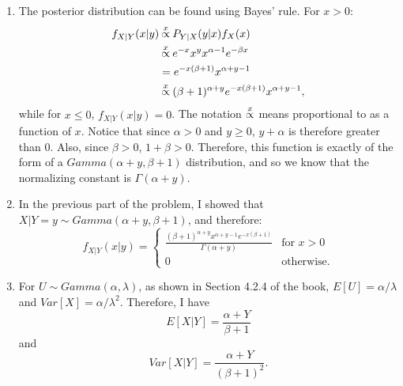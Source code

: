 \begin{problem}{17} $ $
\begin{enumerate}


\item The posterior distribution can be found using Bayes' rule.  For $x>0:$
\begin{align*}
f_{X|Y}(x|y) & \propof{x} P_{Y|X}(y|x)f_X(x) \\
& \propof{x} e^{-x}x^yx^{\alpha-1}e^{-\beta x} \\
& = e^{-x (\beta+1)} x^{\alpha+y -1} \\
& \propof{x} (\beta+1)^{\alpha+y}e^{-x (\beta+1)} x^{\alpha+y -1},
\end{align*}
while for $x \le 0$, $f_{X|Y}(x|y) =0$.  The notation $\propof{x}$ means proportional to as a function of $x$.  Notice that since $\alpha>0$ and $y \ge 0$, $y+\alpha$ is therefore greater than 0.  Also, since $\beta>0$, $1+\beta>0$.  Therefore, this function is exactly of the form of a $Gamma(\alpha+y, \beta+1)$ distribution, and so we know that the normalizing constant is $\Gamma(\alpha+y)$.

\item In the previous part of the problem, I showed that $X|Y=y \sim Gamma(\alpha+y, \beta+1)$, and therefore:
\[
f_{X|Y}(x|y)=
  \begin{cases}
                                  \frac{(\beta+1)^{\alpha+y}x^{\alpha+y-1}e^{-x(\beta+1)}}{\Gamma(\alpha+y)}& \text{for $x>0$} \\
                                   0 & \text{otherwise}.
  \end{cases}
\]

\item For $U \sim Gamma(\alpha, \lambda)$, as shown in Section 4.2.4 of the book, $E[U] = \alpha/\lambda$ and $Var[X] = \alpha/\lambda^2$.  Therefore, I have
\begin{equation*}
E[X|Y] = \frac{\alpha+Y}{ \beta+1}
\end{equation*}
and 
\begin{equation*}
Var[X|Y] = \frac{\alpha+Y}{ (\beta+1)^2}.
\end{equation*}

\end{enumerate}

\end{problem}

